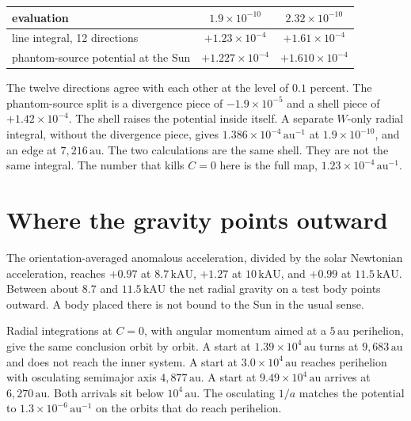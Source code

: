 \begin{center}
\begin{tabular}{lcc}
\hline
evaluation & \(1.9\times10^{-10}\) & \(2.32\times10^{-10}\) \\
\hline
line integral, 12 directions & \(+1.23\times10^{-4}\) & \(+1.61\times10^{-4}\) \\
phantom-source potential at the Sun & \(+1.227\times10^{-4}\) & \(+1.610\times10^{-4}\) \\
\hline
\end{tabular}
\end{center}

The twelve directions agree with each other at the level of \(0.1\) percent. The phantom-source split is a divergence piece of \(-1.9\times10^{-5}\) and a shell piece of \(+1.42\times10^{-4}\). The shell raises the potential inside itself. A separate \(W\)-only radial integral, without the divergence piece, gives \(1.386\times10^{-4}\,\mathrm{au^{-1}}\) at \(1.9\times10^{-10}\), and an edge at \(7{,}216\,\mathrm{au}\). The two calculations are the same shell. They are not the same integral. The number that kills \(C=0\) here is the full map, \(1.23\times10^{-4}\,\mathrm{au^{-1}}\).

\section{Where the gravity points outward}

The orientation-averaged anomalous acceleration, divided by the solar Newtonian acceleration, reaches \(+0.97\) at \(8.7\,\mathrm{kAU}\), \(+1.27\) at \(10\,\mathrm{kAU}\), and \(+0.99\) at \(11.5\,\mathrm{kAU}\). Between about \(8.7\) and \(11.5\,\mathrm{kAU}\) the net radial gravity on a test body points outward. A body placed there is not bound to the Sun in the usual sense.

Radial integrations at \(C=0\), with angular momentum aimed at a \(5\,\mathrm{au}\) perihelion, give the same conclusion orbit by orbit. A start at \(1.39\times10^{4}\,\mathrm{au}\) turns at \(9{,}683\,\mathrm{au}\) and does not reach the inner system. A start at \(3.0\times10^{4}\,\mathrm{au}\) reaches perihelion with osculating semimajor axis \(4{,}877\,\mathrm{au}\). A start at \(9.49\times10^{4}\,\mathrm{au}\) arrives at \(6{,}270\,\mathrm{au}\). Both arrivals sit below \(10^{4}\,\mathrm{au}\). The osculating \(1/a\) matches the potential to \(1.3\times10^{-6}\,\mathrm{au^{-1}}\) on the orbits that do reach perihelion.

